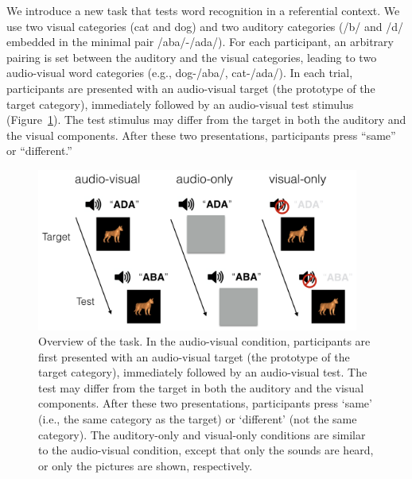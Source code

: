 \documentclass[english,floatsintext,man]{apa6}
\theoremstyle{definition}
\theoremstyle{definition}
\theoremstyle{definition}
\theoremstyle{remark}
\begin{document}
We introduce a new task that tests word recognition in a referential
context. We use two visual categories (cat and dog) and two auditory
categories (/b/ and /d/ embedded in the minimal pair /aba/-/ada/). For
each participant, an arbitrary pairing is set between the auditory and
the visual categories, leading to two audio-visual word categories
(e.g., dog-/aba/, cat-/ada/). In each trial, participants are presented
with an audio-visual target (the prototype of the target category),
immediately followed by an audio-visual test stimulus
(Figure~\ref{fig:task}). The test stimulus may differ from the target in
both the auditory and the visual components. After these two
presentations, participants press \enquote{same} or \enquote{different.}

\begin{figure}

{\centering \includegraphics[width=400px]{pictures/task} 

}

\caption{Overview of the task. In the audio-visual condition, participants are first presented with an audio-visual target (the prototype of the target category), immediately followed by an audio-visual test. The test may differ from the target in both the auditory and the visual components. After these two presentations, participants press `same' (i.e., the same category as the target) or `different' (not the same category). The auditory-only and visual-only conditions are similar to the audio-visual condition, except that only the sounds are heard, or only the pictures are shown, respectively.}\label{fig:task}
\end{figure}
\end{document}
